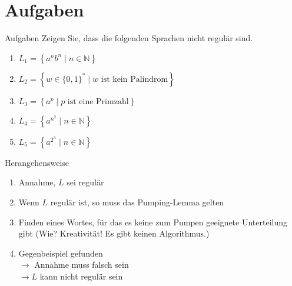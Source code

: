 \documentclass[]{beamer}
\begin{document}
\section{Aufgaben}
\begin{frame}[squeezue]{}
  \vspace*{-0.25em}
  \begin{alertblock}{Aufgaben}
    Zeigen Sie, dass die folgenden Sprachen nicht regulär sind.
    \begin{enumerate}
      \item $L_1 = \left\{a^n b^n \; | \; n \in \mathbb{N} \right\}$
      \item $L_2 = \left\{w \in \{0, 1\}^* \;|\; w \text{ ist kein Palindrom}\right\}$
      \item $L_3 = \left\{a^p \;|\; p \text{ ist eine Primzahl}\right\}$
      \item $L_4 = \left\{a^{n^2} \;|\; n \in \mathbb{N}\right\}$
      \item $L_5 = \left\{a^{2^n} \;|\; n \in \mathbb{N}\right\}$
    \end{enumerate}
  \end{alertblock}
  
  \pause
  \vspace*{-0.5em}
  
  \begin{block}{Herangehensweise}
    \begin{enumerate}
      \item Annahme, $L$ sei regulär
      \item Wenn $L$ regulär ist, so muss das Pumping-Lemma gelten
      \item Finden eines Wortes, für das es keine zum Pumpen geeignete Unterteilung gibt (Wie? Kreativität! Es gibt keinen Algorithmus.)
      \item Gegenbeispiel gefunden \\
            $\rightarrow$ Annahme muss falsch sein \\
            $\rightarrow L$ kann nicht regulär sein
    \end{enumerate}
  \end{block}
\end{frame}
\end{document}
